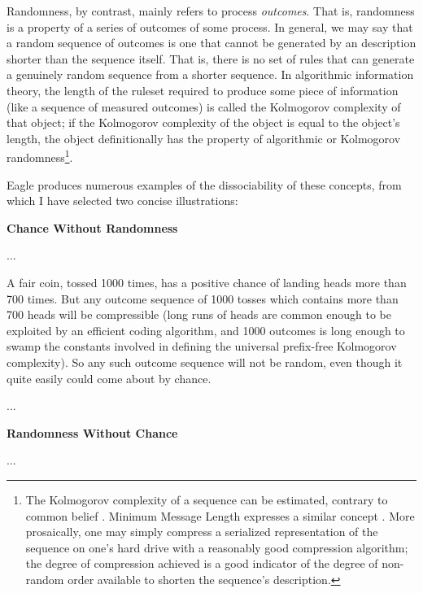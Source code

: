 \documentclass{ut-thesis}
\begin{document}
\begin{NoHyper}
Randomness, by contrast, mainly refers to process \textit{outcomes}. That is, randomness is a property of a series of outcomes of some process. In general, we may say that a random sequence of outcomes is one that cannot be generated by an description shorter than the sequence itself. That is, there is no set of rules that can generate a genuinely random sequence from a shorter sequence. In algorithmic information theory, the length of the ruleset required to produce some piece of information (like a sequence of measured outcomes) is called the Kolmogorov complexity of that object; if the Kolmogorov complexity of the object is equal to the object's length, the object definitionally has the property of algorithmic or Kolmogorov randomness\footnote{The Kolmogorov complexity of a sequence can be estimated, contrary to common belief \cite{Li2008}. Minimum Message Length expresses a similar concept \cite{Wallace1999}. More prosaically, one may simply compress a serialized representation of the sequence on one's hard drive with a reasonably good compression algorithm; the degree of compression achieved is a good indicator of the degree of non-random order available to shorten the sequence's description.}.

Eagle produces numerous examples of the dissociability of these concepts, from which I have selected two concise illustrations:

\begin{longquote}
\textbf{Chance Without Randomness}

...

A fair coin, tossed 1000 times, has a positive chance of landing heads more than 700 times. But any outcome sequence of 1000 tosses which contains more than 700 heads will be compressible (long runs of heads are common enough to be exploited by an efficient coding algorithm, and 1000 outcomes is long enough to swamp the constants involved in defining the universal prefix-free Kolmogorov complexity). So any such outcome sequence will not be random, even though it quite easily could come about by chance. 

...

\textbf{Randomness Without Chance}

...


\end{longquote}
\end{NoHyper}
\end{document}
